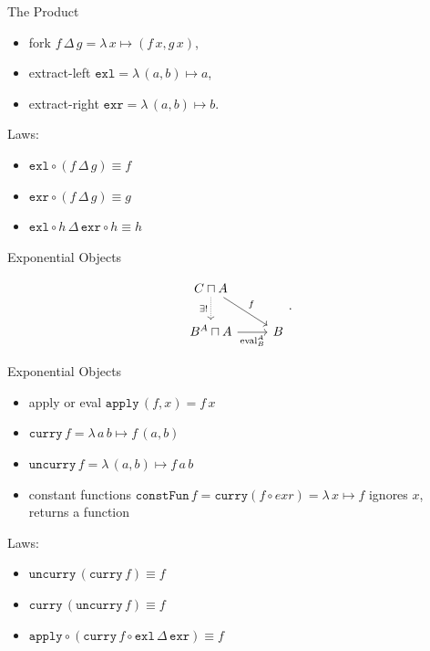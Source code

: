 \documentclass[10pt]{beamer}
\newcommand{\apply}{\mathtt{apply}}
\newcommand{\curry}{\mathtt{curry}}
\newcommand{\uncurry}{\mathtt{uncurry}}
\newcommand{\exl}{\mathtt{exl}}
\newcommand{\exr}{\mathtt{exr}}
\newcommand{\lamf}[2]{\ensuremath{\lambda\, #1 \mapsto #2}}
\newcommand{\delprod}[2]{\ensuremath{#1\,\Delta\,#2}}
\newcommand{\constFun}{\ensuremath{\mathtt{constFun}}}
\theoremstyle{definition}
\theoremstyle{remark}
\numberwithin{equation}{section}
\begin{document}
\begin{frame}[fragile]{The Product}
  \begin{itemize}
  \item fork $\delprod{f}{g} = \lamf{x}{(f\,x,g\,x)}$,
  \item extract-left $\exl = \lamf{(a,b)}{a}$,
  \item extract-right $\exr = \lamf{(a,b)}{b}$.
  \end{itemize}
  
  Laws:\\
  \begin{itemize}
  \item $\exl\circ(\delprod{f}{g}) \equiv f$
  \item $\exr\circ(\delprod{f}{g}) \equiv g$
  \item $\delprod{\exl\circ h}{\exr\circ h} \equiv h$
  \end{itemize}
\end{frame}

\begin{frame}[fragile]{Exponential Objects}
  \begin{center}
    \[
    \begin{tikzcd}
      C \sqcap A \arrow[swap,densely dotted]{d}{\exists!} \arrow{dr}{f} & \\
      B^A \sqcap A \arrow[swap]{r}{\mathrm{eval}_B^A} & B
    \end{tikzcd}\rlap{.}
    \]
  \end{center}
\end{frame}

\begin{frame}[fragile]{Exponential Objects}
  \begin{itemize}
  \item apply or eval $\apply\, (f,x) = f\,x$
  \item $\curry\, f = \lamf{a\,b}{f\,(a,b)}$
  \item $\uncurry\, f = \lamf{(a,b)}{f\,a\,b}$
  \item constant functions $\constFun\, f = \curry (f \circ exr) = \lamf{x}{f}$ ignores $x$, returns a function
  \end{itemize}
  
  Laws:\\
  \begin{itemize}
  \item $\uncurry\,(\curry\,f) \equiv f$
  \item $\curry\,(\uncurry\,f) \equiv f$
  \item $\apply \circ (\delprod{\curry\,f\circ\exl}{\exr}) \equiv f$
  \end{itemize}
\end{frame}
\end{document}
